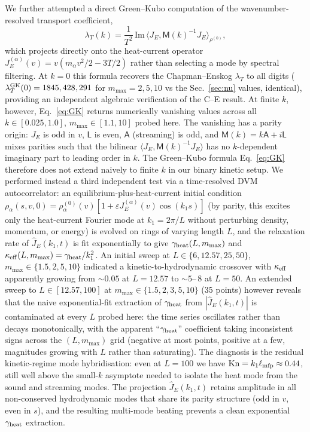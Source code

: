 \documentclass[aps,pre,twocolumn,superscriptaddress,longbibliography,floatfix]{revtex4-2}
\begin{document}
We further attempted a direct Green--Kubo computation of
the wavenumber-resolved transport coefficient,
\begin{equation}
\lambda_T(k) =
\frac{1}{T^{2}}\,\mathrm{Im}\,
\langle J_E, \mathsf{M}(k)^{-1} J_E\rangle_{\rho^{(0)}},
\label{eq:GK}
\end{equation}
which projects directly onto the heat-current operator
$J_E^{(\alpha)}(v)=v(m_\alpha v^2/2 - 3T/2)$ rather than
selecting a mode by spectral filtering. At $k=0$ this
formula recovers the Chapman--Enskog $\lambda_T$ to all
digits ($\lambda_T^{\rm GK}(0)=1845, 428, 291$ for
$m_{\max}=2, 5, 10$ vs the Sec.~\ref{sec:nu} values,
identical), providing an independent algebraic
verification of the C--E result. At finite $k$, however,
Eq.~\eqref{eq:GK} returns numerically vanishing values
across all $k\in[0.025, 1.0]$, $m_{\max}\in[1.1, 10]$ probed
here. The vanishing has a parity origin: $J_E$ is odd
in $v$, $\mathsf{L}$ is even, $\mathsf{A}$ (streaming) is
odd, and $\mathsf{M}(k)=k\mathsf{A}+i\mathsf{L}$ mixes
parities such that the bilinear
$\langle J_E,\mathsf{M}(k)^{-1}J_E\rangle$ has no
$k$-dependent imaginary part to leading order in
$k$. The Green--Kubo formula Eq.~\eqref{eq:GK} therefore
does not extend naively to finite $k$ in our binary
kinetic setup. We performed instead a third independent
test via a time-resolved DVM autocorrelator: an
equilibrium-plus-heat-current initial condition
$\rho_\alpha(s,v,0)=\rho_\alpha^{(0)}(v)
[1+\varepsilon J_E^{(\alpha)}(v)\cos(k_1 s)]$
(by parity, this excites only the heat-current Fourier
mode at $k_1=2\pi/L$ without perturbing density,
momentum, or energy) is evolved on rings of varying length
$L$, and the relaxation rate of $\hat J_E(k_1, t)$ is fit
exponentially to give $\gamma_{\rm heat}(L, m_{\max})$ and
$\kappa_{\rm eff}(L, m_{\max})=\gamma_{\rm heat}/k_1^2$.
An initial sweep at
$L\in\{6, 12.57, 25, 50\}$, $m_{\max}\in\{1.5, 2, 5, 10\}$
indicated a kinetic-to-hydrodynamic crossover with
$\kappa_{\rm eff}$ apparently growing from $\sim 0.05$ at
$L=12.57$ to $\sim 5$--$\,8$ at $L=50$. An extended
sweep to $L\in[12.57, 100]$ at $m_{\max}\in\{1.5, 2, 3, 5,
10\}$ (35 points) however reveals that the naive
exponential-fit extraction of $\gamma_{\rm heat}$ from
$|\hat J_E(k_1, t)|$ is contaminated at every $L$ probed
here: the time series oscillates rather than decays
monotonically, with the apparent ``$\gamma_{\rm heat}$''
coefficient taking inconsistent signs across the $(L,
m_{\max})$ grid (negative at most points, positive at a
few, magnitudes growing with $L$ rather than saturating).
The diagnosis is the residual kinetic-regime mode
hybridisation: even at $L=100$ we have
$\mathrm{Kn}=k_1\ell_{\rm mfp}\approx 0.44$, still
well above the small-$k$ asymptote needed to isolate the
heat mode from the sound and streaming modes. The
projection $\hat J_E(k_1, t)$ retains amplitude in all
non-conserved hydrodynamic modes that share its parity
structure (odd in $v$, even in $s$), and the resulting
multi-mode beating prevents a clean exponential
$\gamma_{\rm heat}$ extraction.
\end{document}
